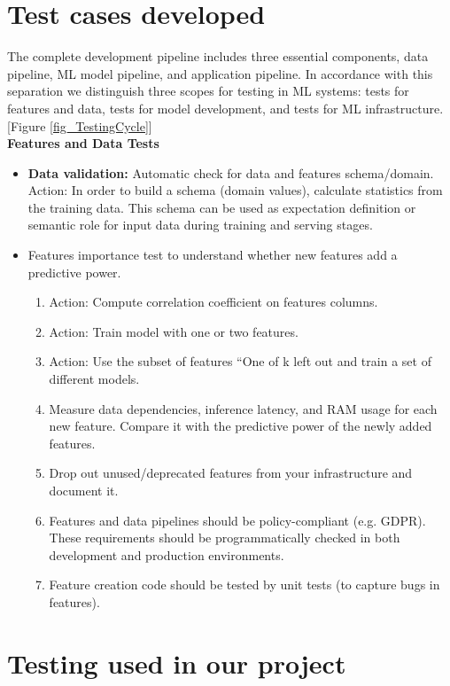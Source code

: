 \documentclass[12pt,oneside,a4paper]{report}
\begin{document}
\section{Test cases developed}
\fontsize{12pt}{10pt}\selectfont
The complete development pipeline includes three essential components, data pipeline, ML model pipeline, and application pipeline. In accordance with this separation we distinguish three scopes for testing in ML systems: tests for features and data, tests for model development, and tests for ML infrastructure.[Figure \ref{fig_TestingCycle}]\\
\Large{\textbf{Features and Data Tests}}\\
\fontsize{12pt}{10pt}\selectfont
\begin{itemize}
\item\textbf{Data validation:} Automatic check for data and features schema/domain.
        Action: In order to build a schema (domain values), calculate statistics from the training data. This schema can be used as expectation definition or semantic role for input data during training and serving stages.
\item Features importance test to understand whether new features add a predictive power.
\begin{enumerate}

      	\item Action: Compute correlation coefficient on features columns.
        \item Action: Train model with one or two features.
        \item Action: Use the subset of features “One of k left out and train a set of different models.
        \item Measure data dependencies, inference latency, and RAM usage for each new feature. Compare it with the predictive power of the newly added features.
        \item Drop out unused/deprecated features from your infrastructure and document it.

    \item Features and data pipelines should be policy-compliant (e.g. GDPR). These requirements should be programmatically checked in both development and production environments.
    \item Feature creation code should be tested by unit tests (to capture bugs in features).
\end{enumerate}
\end{itemize}
\newpage
\section{Testing used in our project}
\end{document}
